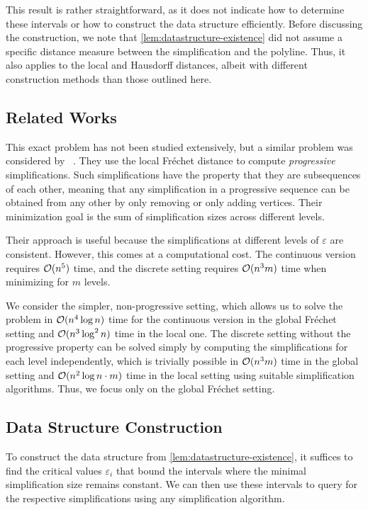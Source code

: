 This result is rather straightforward, as it does not indicate how to determine these intervals or how to construct the data structure efficiently. Before discussing the construction, we note that \cref{lem:datastructure-existence} did not assume a specific distance measure between the simplification and the polyline. Thus, it also applies to the local and Hausdorff distances, albeit with different construction methods than those outlined here.

\subsection{Related Works}
This exact problem has not been studied extensively, but a similar problem was considered by \citeauthor{progressive_simplification_buchinetal}~\cite{progressive_simplification_buchinetal}. They use the local Fréchet distance to compute \emph{progressive} simplifications. Such simplifications have the property that they are subsequences of each other, meaning that any simplification in a progressive sequence can be obtained from any other by only removing or only adding vertices. Their minimization goal is the sum of simplification sizes across different levels.

Their approach is useful because the simplifications at different levels of \(\varepsilon\) are consistent. However, this comes at a computational cost. The continuous version requires \(\mathcal{O}(n^5)\) time, and the discrete setting requires \(\mathcal{O}(n^3 m)\) time when minimizing for \(m\) levels.

We consider the simpler, non-progressive setting, which allows us to solve the problem in \(\mathcal{O}(n^4 \log n)\) time for the continuous version in the global Fréchet setting and \(\mathcal{O}(n^3 \log^2 n)\) time in the local one. The discrete setting without the progressive property can be solved simply by computing the simplifications for each level independently, which is trivially possible in \(\mathcal{O}(n^3 m)\) time in the global setting and \(\mathcal{O}(n^2 \log n \cdot m)\) time in the local setting using suitable simplification algorithms. Thus, we focus only on the global Fréchet setting.

\subsection{Data Structure Construction}
\label{ssec:ds-construction}

To construct the data structure from \cref{lem:datastructure-existence}, it suffices to find the critical values \(\varepsilon_i\) that bound the intervals where the minimal simplification size remains constant. We can then use these intervals to query for the respective simplifications using any simplification algorithm.

